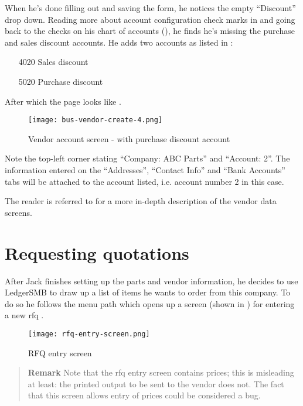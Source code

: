 When he's done filling out and saving the form,
he notices the empty ``Discount'' drop down. Reading more about account configuration
check marks in  and going back to the checks on his
chart of accounts (), he finds he's missing the purchase and
sales discount accounts. He adds two accounts as listed in :

\begin{itemize}
\item [4020] Sales discount
\item [5020] Purchase discount
\end{itemize}

After which the page looks like .

\begin{figure}[h]
\centering
\texttt{[image: bus-vendor-create-4.png]}
\caption{Vendor account screen - with purchase discount account}
\label{fig:vendor-create-3}
\end{figure}

Note the top-left corner stating ``Company: ABC Parts'' and ``Account: 2''. The information
entered on the ``Addresses'', ``Contact Info'' and ``Bank Accounts'' tabs will be attached
to the account listed, i.e. account number 2 in this case.

The reader is referred to  for a more in-depth
description of the vendor data screens.

\section{Requesting quotations}
\label{sec-stock-request-quotation}

After Jack finishes setting up the parts and vendor information, he decides to use LedgerSMB to draw
up a list of items he wants to order from this company. To do so he follows the menu path
 which opens up a screen (shown
in ) for entering a new \gls{rfq} .

\begin{figure}[h]
\centering
\texttt{[image: rfq-entry-screen.png]}
\caption{RFQ entry screen}
\label{fig:bus-rfq-entry-screen}
\end{figure}

\begin{quotation}
\textbf{Remark} Note that the \gls{rfq} entry screen contains prices; this is misleading
at least: the printed output to be sent to the vendor does not. The fact that this screen
allows entry of prices could be considered a bug.
\end{quotation}

